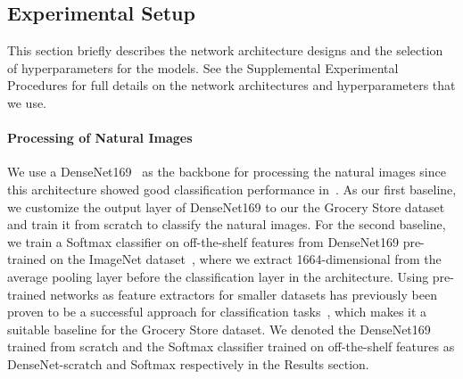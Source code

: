 \subsection{Experimental Setup}
\label{sec:experimental_setup}

This section briefly describes the network architecture designs and the selection of hyperparameters for the models. See the Supplemental Experimental Procedures
for full details on the network architectures and hyperparameters that we use.

\paragraph{Processing of Natural Images} We use a DenseNet169~\cite{huang2017densely} as the backbone for processing the natural images since this architecture showed good classification performance in~\cite{klasson2019hierarchical}. As our first baseline, we customize the output layer of DenseNet169 to our the Grocery Store dataset and train it from scratch to classify the natural images. For the second baseline, we train a Softmax classifier on off-the-shelf features from DenseNet169 pre-trained on the ImageNet dataset~\cite{deng2009imagenet}, where we extract 1664-dimensional from the average pooling layer before the classification layer in the architecture. Using pre-trained networks as feature extractors for smaller datasets has previously been proven to be a successful approach for classification tasks~\cite{razavian2014cnnfeatures}, which makes it a suitable baseline for the Grocery Store dataset. We denoted the DenseNet169 trained from scratch and the Softmax classifier trained on off-the-shelf features as DenseNet-scratch and Softmax respectively in the Results section.%

